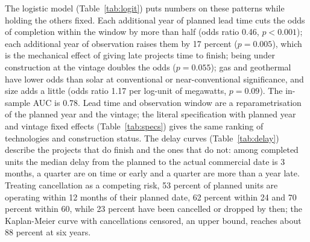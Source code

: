\begin{table}[H]
\centering\footnotesize
\caption{Logistic model of completion by December 2025 (unit-vintage observations; standard errors clustered by unit; reference categories solar and approvals not initiated).}
\label{tab:logit}

\end{table}

\begin{table}[H]
\centering\footnotesize
\caption{Three specifications of the completion model: the main model, the model without construction status, and the literal specification with planned year and vintage fixed effects.}
\label{tab:specs}
\resizebox{\textwidth}{!}{}
\end{table}

\begin{table}[H]
\centering\footnotesize
\caption{Delay from the planned to the actual commercial date, seven vintages pooled.}
\label{tab:delay}

\end{table}

The logistic model (Table~\ref{tab:logit}) puts numbers on these patterns while holding the others fixed. Each additional year of planned lead time cuts the odds of completion within the window by more than half (odds ratio 0.46, $p < 0.001$); each additional year of observation raises them by 17 percent ($p = 0.005$), which is the mechanical effect of giving late projects time to finish; being under construction at the vintage doubles the odds ($p = 0.055$); gas and geothermal have lower odds than solar at conventional or near-conventional significance, and size adds a little (odds ratio 1.17 per log-unit of megawatts, $p = 0.09$). The in-sample AUC is 0.78. Lead time and observation window are a reparametrisation of the planned year and the vintage; the literal specification with planned year and vintage fixed effects (Table~\ref{tab:specs}) gives the same ranking of technologies and construction status. The delay curves (Table~\ref{tab:delay}) describe the projects that do finish and the ones that do not: among completed units the median delay from the planned to the actual commercial date is 3 months, a quarter are on time or early and a quarter are more than a year late. Treating cancellation as a competing risk, 53 percent of planned units are operating within 12 months of their planned date, 62 percent within 24 and 70 percent within 60, while 23 percent have been cancelled or dropped by then; the Kaplan-Meier curve with cancellations censored, an upper bound, reaches about 88 percent at six years.

